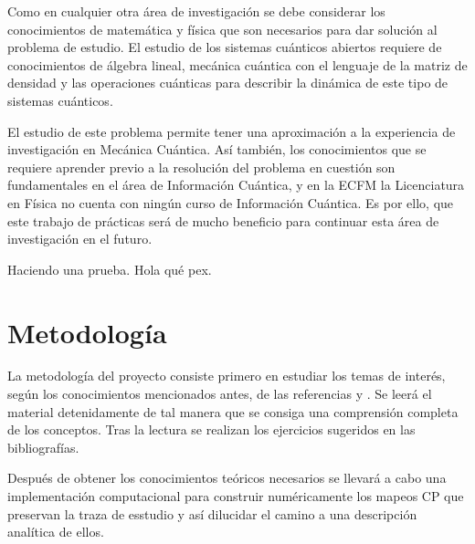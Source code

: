 \documentclass[11pt, spanish, letterpage]{article} %
\newcounter{problem}[section]
\begin{document}
Como en cualquier otra área de investigación se debe considerar los
conocimientos de matemática y física que son necesarios para dar solución al
problema de estudio. El estudio de los sistemas cuánticos abiertos requiere de
conocimientos de álgebra lineal, mecánica cuántica con el lenguaje de la matriz
de densidad y las operaciones cuánticas para describir la dinámica de este tipo
de sistemas cuánticos.

El estudio de este problema permite tener una aproximación a la experiencia de
investigación en Mecánica Cuántica. Así también, los conocimientos que se
requiere aprender previo a la resolución del problema en cuestión son
fundamentales en el área de Información Cuántica, y en la ECFM la Licenciatura
en Física no cuenta con ningún curso de Información Cuántica. Es por ello, que
este trabajo de prácticas será de mucho beneficio para continuar esta área de
investigación en el futuro.  

Haciendo una prueba. Hola qué pex. 

\section{Metodología}%
La metodología del proyecto consiste primero en estudiar los temas de interés,
según los conocimientos mencionados antes, de las referencias
\cite{bengtsson_zyczkowski_2017} y \cite{nielsen_chuang_2011}. Se leerá el
material detenidamente de tal manera que se consiga una comprensión completa de
los conceptos. Tras la lectura se realizan los ejercicios sugeridos en las
bibliografías. 

Después de obtener los conocimientos teóricos necesarios se llevará a cabo una
implementación computacional para construir numéricamente los mapeos CP que
preservan la traza de esstudio y así dilucidar el camino a una descripción
analítica de ellos. 
\newpage
\end{document}
